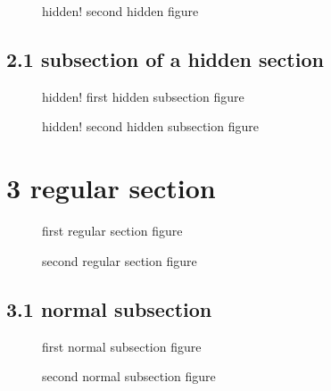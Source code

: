 \begin{figure}
\centering
{}
\caption[]{hidden! second hidden figure}\label{fig:fig_h2}
\end{figure}

\subsection{2.1 subsection of a hidden
section}\label{subsection-of-a-hidden-section}

\begin{figure}
\centering
{}
\caption[]{hidden! first hidden subsection figure}\label{fig:fig_h1_s}
\end{figure}

\begin{figure}
\centering
{}
\caption[]{hidden! second hidden subsection figure}\label{fig:fig_h2_s}
\end{figure}

\section{3 regular section}\label{regular-section}

\begin{figure}
\centering
{}
\caption{first regular section figure}\label{fig:fig_r1}
\end{figure}

\begin{figure}
\centering
{}
\caption{second regular section figure}\label{fig:fig_r2}
\end{figure}

\subsection{3.1 normal subsection}\label{normal-subsection}

\begin{figure}
\centering
{}
\caption{first normal subsection figure}\label{fig:fig_nss1}
\end{figure}

\begin{figure}
\centering
{}
\caption{second normal subsection figure}\label{fig:fig_nss2}
\end{figure}

